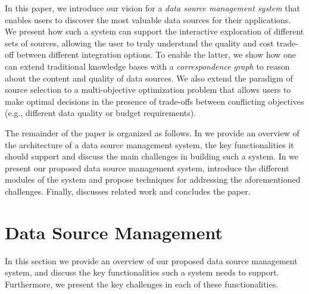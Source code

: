 \documentclass{sig-alternate}
\begin{document}
In this paper, we introduce our vision for a {\em data source management system} that enables users to discover the most valuable data sources for their applications. We present how such a system can support the interactive exploration of different sets of sources, allowing the user to truly understand the quality and cost trade-off between different integration options. To enable the latter, we show how one can extend traditional knowledge bases with a {\em correspondence graph} to reason about the content and quality of data sources. We also extend the paradigm of source selection to a multi-objective optimization problem that allows users to make optimal decisions in the presence of trade-offs between conflicting objectives (e.g., different data quality or budget requirements).

The remainder of the paper is organized as follows. In  we provide an overview of the architecture of a data source management system, the key functionalities it should support and discuss the main challenges in building such a system. In  we present our proposed data source management system, introduce the different modules of the system and propose techniques for addressing the aforementioned challenges. Finally,  discusses related work and  concludes the paper. 

\section{Data Source Management}
\label{sec:overview}
In this section we provide an overview of our proposed data source management system, and discuss the key functionalities such a system needs to support. Furthermore, we present the key challenges in each of these functionalities.
\end{document}
